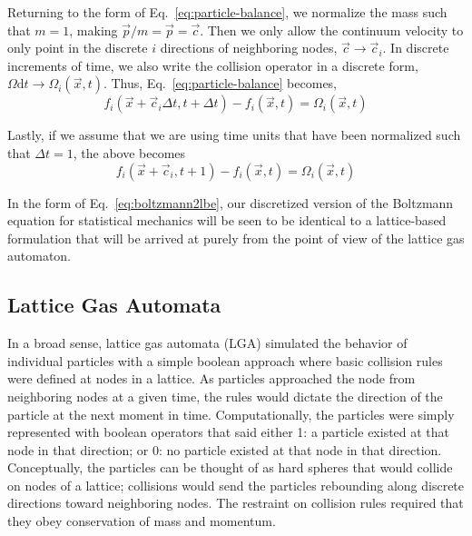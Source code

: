 Returning to the form of Eq.~\ref{eq:particle-balance}, we normalize the mass such that $m=1$, making $\vec{p}/m = \vec{p}=\vec{c}$. Then we only allow the continuum velocity to only point in the discrete $i$ directions of neighboring nodes, $\vec{c}\rightarrow\vec{c}_i$. In discrete increments of time, we also write the collision operator in a discrete form, $\Omega\mathrm{d}t \rightarrow \Omega_i(\vec{x},t)$. Thus, Eq.~\ref{eq:particle-balance} becomes,
\begin{equation}
	f_i(\vec{x}+\vec{c}_i\Delta t, t + \Delta t) - f_i(\vec{x},t) = \Omega_i(\vec{x},t)
\end{equation}

Lastly, if we assume that we are using time units that have been normalized such that $\Delta t = 1$, the above becomes
\begin{equation}\label{eq:boltzmann2lbe}
	f_i(\vec{x}+\vec{c}_i, t + 1) - f_i(\vec{x},t) = \Omega_i(\vec{x},t)
\end{equation}

In the form of Eq.~\ref{eq:boltzmann2lbe}, our discretized version of the Boltzmann equation for statistical mechanics will be seen to be identical to a lattice-based formulation that will be arrived at purely from the point of view of the lattice gas automaton.



\subsection{Lattice Gas Automata}

In a broad sense, lattice gas automata (LGA) simulated the behavior of individual particles with a simple boolean approach where basic collision rules were defined at nodes in a lattice. As particles approached the node from neighboring nodes at a given time, the rules would dictate the direction of the particle at the next moment in time. Computationally, the particles were simply represented with boolean operators that said either 1: a particle existed at that node in that direction; or 0: no particle existed at that node in that direction. Conceptually, the particles can be thought of as hard spheres that would collide on nodes of a lattice; collisions would send the particles rebounding along discrete directions toward neighboring nodes. The restraint on collision rules required that they obey conservation of mass and momentum. 

